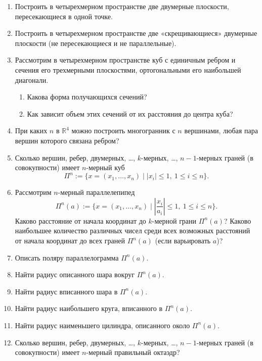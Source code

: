 \begin{enumerate}
		\item Построить в четырехмерном пространстве две двумерные плоскости, пересекающиеся в одной точке.

		\item Построить в четырехмерном пространстве две «скрещивающиеся» двумерные плоскости 
		(не пересекающиеся и не параллельные).

		\item Рассмотрим в четырехмерном пространстве куб с единичным ребром и сечения его 
		трехмерными плоскостями, ортогональными его наибольшей диагонали. 
		\begin{enumerate}
			\item Какова форма получающихся сечений?  
			\item Как зависит объем этих сечений от их расстояния до центра куба?
		\end{enumerate}
		\item При каких $n$ в $\mathbb{R}^4$ можно построить многогранник с $n$ вершинами, 
		любая пара вершин которого связана ребром?

		\item Сколько вершин, ребер, двумерных, …, $k$-мерных, …, $n-1$-мерных граней 
		(в совокупности) имеет $n$-мерный куб 
		\[
			\Pi^n := \{ x = (x_1,\dots,x_n) \mid |x_i| \le 1,\ 1 \le i \le n \}.
		\]

		\item Рассмотрим $n$-мерный параллелепипед 
		\[
			\Pi^n(a) := \{ x = (x_1,\dots,x_n) \mid \left| \frac{x_i}{a_i} \right| \le 1,\ 1 \le i \le n \}.
		\]
		Каково расстояние от начала координат до $k$-мерной грани $\Pi^n(a)$?  
		Каково наибольшее количество различных чисел среди всех возможных расстояний 
		от начала координат до всех граней $\Pi^n(a)$ (если варьировать $a$)?

		\item Описать поляру параллелограмма $\Pi^n(a)$.

		\item Найти радиус описанного шара вокруг $\Pi^n(a)$.

		\item Найти радиус вписанного шара в $\Pi^n(a)$.

		\item Найти радиус наибольшего круга, вписанного в $\Pi^n(a)$.

		\item Найти радиус наименьшего цилиндра, описанного около $\Pi^n(a)$.

		\item Сколько вершин, ребер, двумерных, …, $k$-мерных, …, $n-1$-мерных граней 
		(в совокупности) имеет $n$-мерный правильный октаэдр?


\end{enumerate}
